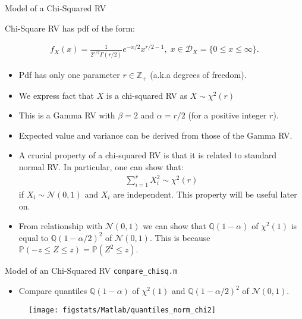 \documentclass[9pt]{beamer}
\begin{document}
%
\begin{frame}{Model of a Chi-Squared RV}

Chi-Square RV has pdf of the form:
\begin{block}{}
\begin{align*}
f_X(x)=\frac{1}{2^{r/2}\Gamma(r/2)}e^{-x/2}x^{r/2-1},\; x\in \mathcal{D}_X=\{0\leq x\leq \infty\}.
\end{align*}
\end{block}
\begin{itemize}
\setlength{\itemsep}{5pt}
\item Pdf has only one parameter $r\in \mathbb{Z}_+$ (a.k.a degrees of freedom).
\item We express fact that $X$ is a chi-squared RV as $X\sim \chi^2(r)$
\item This is a Gamma RV with $\beta=2$ and $\alpha=r/2$ (for a positive integer $r$). 
\item Expected value and variance can be derived from those of the Gamma RV.  
\item A crucial property of a chi-squared RV is that it is related to standard normal RV. In particular, one can show that: 
\begin{align*}
\sum_{i=1}^rX_i^2\sim \chi^2(r)
\end{align*}
if $X_i\sim \mathcal{N}(0,1)$ and $X_i$ are independent. This property will be useful later on. 
\item From relationship with $\mathcal{N}(0,1)$ we can show that $\mathbb{Q}(1-\alpha)$ of $\chi^2(1)$ is equal to $\mathbb{Q}(1-\alpha/2)^2$ of $\mathcal{N}(0,1)$. This is because $\mathbb{P}(-z\leq Z\leq z)=\mathbb{P}(Z^2\leq z)$.  
\end{itemize}

\end{frame}

%
\begin{frame}{Model of an Chi-Squared RV \footnotesize{\texttt{compare\_chisq.m}}}
\begin{itemize}
\item Compare quantiles $\mathbb{Q}(1-\alpha)$ of $\chi^2(1)$ and $\mathbb{Q}(1-\alpha/2)^2$ of $\mathcal{N}(0,1)$.
\end{itemize}
\begin{figure}[!htb]
    \centering
	\texttt{[image: figstats/Matlab/quantiles\_norm\_chi2]}
\end{figure}

\end{frame}
\end{document}
